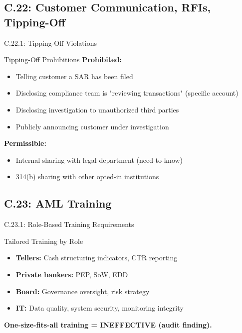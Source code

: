 \documentclass{beamer}
\begin{document}
		\subsection{C.22: Customer Communication, RFIs, Tipping-Off}
		
		\begin{frame}{C.22.1: Tipping-Off Violations}
			\begin{block}{Tipping-Off Prohibitions}
				\textbf{Prohibited:}
				\begin{itemize}
					\item Telling customer a SAR has been filed
					\item Disclosing compliance team is "reviewing transactions" (specific account)
					\item Disclosing investigation to unauthorized third parties
					\item Publicly announcing customer under investigation
				\end{itemize}
			\end{block}
			\textbf{Permissible:}
			\begin{itemize}
				\item Internal sharing with legal department (need-to-know)
				\item 314(b) sharing with other opted-in institutions
			\end{itemize}
		\end{frame}
		
		\subsection{C.23: AML Training}
		
		\begin{frame}{C.23.1: Role-Based Training Requirements}
			\begin{block}{Tailored Training by Role}
				\begin{itemize}
					\item \textbf{Tellers:} Cash structuring indicators, CTR reporting
					\item \textbf{Private bankers:} PEP, SoW, EDD
					\item \textbf{Board:} Governance oversight, risk strategy
					\item \textbf{IT:} Data quality, system security, monitoring integrity
				\end{itemize}
			\end{block}
			\textbf{ One-size-fits-all training = INEFFECTIVE (audit finding).}
		\end{frame}
		
\end{document}
